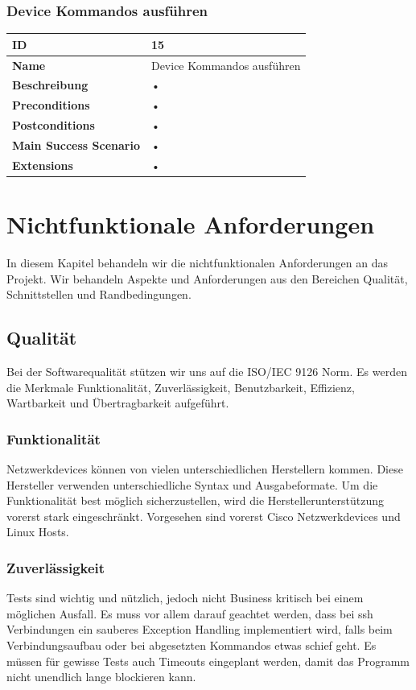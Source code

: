 \subsubsection{Device Kommandos ausführen}
\mbox{}
\begin{longtable}{| p{4cm} | p{11.7cm} |}
 \hline
 \textbf{ID} & 15\\ \hline 
 \textbf{Name} & Device Kommandos ausführen\\ \hline 
 \textbf{Beschreibung} & • \\ \hline 
 \textbf{Preconditions} & • \\ \hline 
 \textbf{Postconditions} & • \\ \hline 
 \textbf{Main Success Scenario} & • \\ \hline 
 \textbf{Extensions} & • \\ \hline 
\end{longtable}


 
 

\section{Nichtfunktionale Anforderungen}
In diesem Kapitel behandeln wir die nichtfunktionalen Anforderungen an das Projekt. Wir behandeln Aspekte und Anforderungen aus den Bereichen Qualität, Schnittstellen und Randbedingungen.
\subsection{Qualität}
Bei der Softwarequalität stützen wir uns auf die ISO/IEC 9126 Norm. Es werden die Merkmale Funktionalität, Zuverlässigkeit, Benutzbarkeit, Effizienz, Wartbarkeit und Übertragbarkeit aufgeführt.
\subsubsection{Funktionalität}
Netzwerkdevices können von vielen unterschiedlichen Herstellern kommen. Diese Hersteller verwenden unterschiedliche Syntax und Ausgabeformate. Um die Funktionalität best möglich sicherzustellen, wird die Herstellerunterstützung vorerst stark eingeschränkt. Vorgesehen sind vorerst Cisco Netzwerkdevices und Linux Hosts.
\subsubsection{Zuverlässigkeit}
Tests sind wichtig und nützlich, jedoch nicht Business kritisch bei einem möglichen Ausfall. Es muss vor allem darauf geachtet werden, dass bei ssh Verbindungen ein sauberes Exception Handling implementiert wird, falls beim Verbindungsaufbau oder bei abgesetzten Kommandos etwas schief geht. Es müssen für gewisse Tests auch Timeouts eingeplant werden, damit das Programm nicht unendlich lange blockieren kann.
